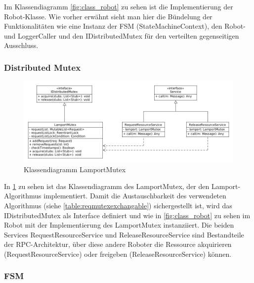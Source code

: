 Im Klassendiagramm \ref{fig:class_robot} zu sehen ist die Implementierung der Robot-Klasse.
Wie vorher erwähnt sieht man hier die Bündelung der Funktionalitäten wie eine 
Instanz der FSM (StateMachineContext), den Robot- und LoggerCaller und den IDistributedMutex für
den verteilten gegenseitigen Ausschluss.

\clearpage

\subsubsection{Distributed Mutex}

\begin{figure}[h]
 \includegraphics[width=\textwidth]{../diagrams/4_lamport_klassendiagramm.png}
 \caption{Klassendiagramm LamportMutex}
 \label{fig:class_lamport}
\end{figure}

In \ref{fig:class_lamport} zu sehen ist das Klassendiagramm des LamportMutex, der den Lamport-Algorithmus
implementiert. Damit die Austauschbarkeit des verwendeten Algorithmus (siehe \ref{table:reqmutexexchangable})
sichergestellt ist, wird das IDistributedMutex als Interface definiert und wie in \ref{fig:class_robot}
zu sehen im Robot mit der Implementierung des LamportMutex instanziiert. Die beiden Services RequestResourceService
und ReleaseResourceService sind Bestandteile der RPC-Architektur, über diese andere Roboter die Ressource
akquirieren (RequestResourceService) oder freigeben (ReleaseResourceService) können.

\clearpage

\subsubsection{FSM}

